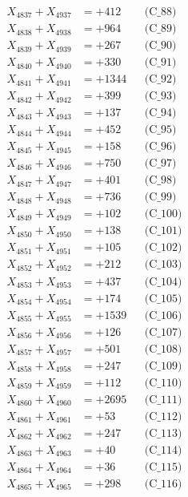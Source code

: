 \documentclass[a4paper,10pt]{article}
\begin{document}
{\begin{align}
X_{4837} + X_{4937} &= +412 && \text{(C\_88)} \\
X_{4838} + X_{4938} &= +964 && \text{(C\_89)} \\
X_{4839} + X_{4939} &= +267 && \text{(C\_90)} \\
\allowbreak
X_{4840} + X_{4940} &= +330 && \text{(C\_91)} \\
X_{4841} + X_{4941} &= +1344 && \text{(C\_92)} \\
X_{4842} + X_{4942} &= +399 && \text{(C\_93)} \\
X_{4843} + X_{4943} &= +137 && \text{(C\_94)} \\
X_{4844} + X_{4944} &= +452 && \text{(C\_95)} \\
\allowbreak
X_{4845} + X_{4945} &= +158 && \text{(C\_96)} \\
X_{4846} + X_{4946} &= +750 && \text{(C\_97)} \\
X_{4847} + X_{4947} &= +401 && \text{(C\_98)} \\
X_{4848} + X_{4948} &= +736 && \text{(C\_99)} \\
X_{4849} + X_{4949} &= +102 && \text{(C\_100)} \\
\allowbreak
X_{4850} + X_{4950} &= +138 && \text{(C\_101)} \\
X_{4851} + X_{4951} &= +105 && \text{(C\_102)} \\
X_{4852} + X_{4952} &= +212 && \text{(C\_103)} \\
X_{4853} + X_{4953} &= +437 && \text{(C\_104)} \\
X_{4854} + X_{4954} &= +174 && \text{(C\_105)} \\
\allowbreak
X_{4855} + X_{4955} &= +1539 && \text{(C\_106)} \\
X_{4856} + X_{4956} &= +126 && \text{(C\_107)} \\
X_{4857} + X_{4957} &= +501 && \text{(C\_108)} \\
X_{4858} + X_{4958} &= +247 && \text{(C\_109)} \\
X_{4859} + X_{4959} &= +112 && \text{(C\_110)} \\
\allowbreak
X_{4860} + X_{4960} &= +2695 && \text{(C\_111)} \\
X_{4861} + X_{4961} &= +53 && \text{(C\_112)} \\
X_{4862} + X_{4962} &= +247 && \text{(C\_113)} \\
X_{4863} + X_{4963} &= +40 && \text{(C\_114)} \\
X_{4864} + X_{4964} &= +36 && \text{(C\_115)} \\
\allowbreak
X_{4865} + X_{4965} &= +298 && \text{(C\_116)} \\

\end{align}}
\end{document}
